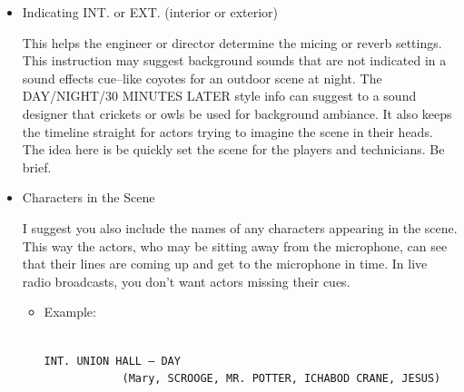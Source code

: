 \documentclass[openleft,oneside,showtrims]{memoir}
\begin{document}
\begin{itemize}
\item Indicating INT. or EXT. (interior or exterior)
\label{sec:org0e0282c}

This helps the engineer or director determine the micing or reverb settings. This instruction may suggest background sounds that are not indicated in a sound effects cue--like coyotes for an outdoor scene at night. The DAY/NIGHT/30 MINUTES LATER style info can suggest to a sound designer that crickets or owls be used for background ambiance. It also keeps the timeline straight for actors trying to imagine the scene in their heads. The idea here is be quickly set the scene for the players and technicians. Be brief.

\item Characters in the Scene  
\label{sec:orgb9824da}

I suggest you also include the names of any characters appearing in the scene. This way the actors, who may be sitting away from the microphone, can see that their lines are coming up and get to the microphone in time. In live radio broadcasts, you don't want actors missing their cues.

\begin{itemize}
\item Example:
\label{sec:org5495242}

\lstset{language=fountain,label= ,caption= ,captionpos=b,numbers=none}
\begin{lstlisting}

INT. UNION HALL – DAY
            (Mary, SCROOGE, MR. POTTER, ICHABOD CRANE, JESUS)

\end{lstlisting}


\end{itemize}
\end{itemize}
\end{document}
